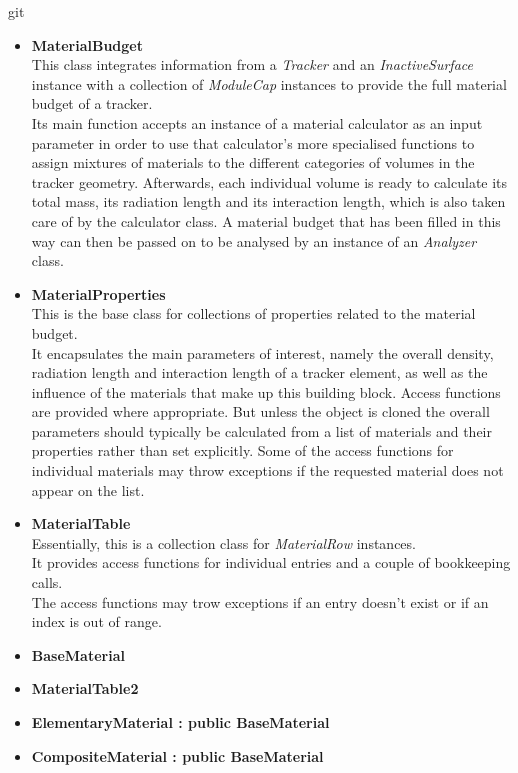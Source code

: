 git\documentclass[12pt, a4paper]{article}
\begin{document}
\begin{itemize}

\item \textbf{MaterialBudget}\\
This class integrates information from a \emph{Tracker} and an \emph{InactiveSurface} instance with a collection of \emph{ModuleCap} instances to provide the full material budget of a tracker.\\
Its main function accepts an instance of a material calculator as an input parameter in order to use that calculator's more specialised functions to assign mixtures of materials to the different categories of volumes in the tracker geometry. Afterwards, each individual volume is ready to calculate its total mass, its radiation length and its interaction length, which is also taken care of by the calculator class. A material budget that has been filled in this way can then be passed on to be analysed by an instance of an \emph{Analyzer} class.

\item \textbf{MaterialProperties}\\
This is the base class for collections of properties related to the material budget.\\
It encapsulates the main parameters of interest, namely the overall density, radiation length and interaction length of a tracker element, as well as the influence of the materials that make up this building block. Access functions are provided where appropriate. But unless the object is cloned the overall parameters should typically be calculated from a list of materials and their properties rather than set explicitly. Some of the access functions for individual materials may throw exceptions if the requested material does not appear on the list.

\item \textbf{MaterialTable} \\
Essentially, this is a collection class for \emph{MaterialRow} instances.\\
It provides access functions for individual entries and a couple of bookkeeping calls.\\
The access functions may trow exceptions if an entry doesn't exist or if an index is out of range.

\item \textbf{BaseMaterial}
\item \textbf{MaterialTable2}
\item \textbf{ElementaryMaterial : public BaseMaterial}
\item \textbf{CompositeMaterial : public BaseMaterial}


\end{itemize}
\end{document}
